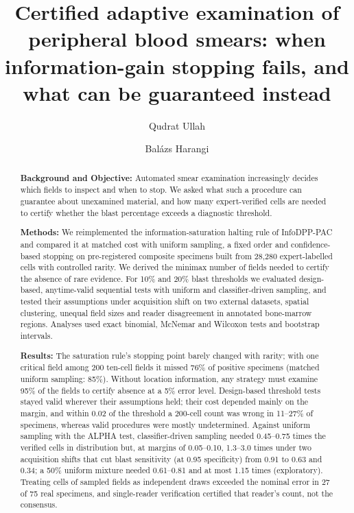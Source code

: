 \documentclass[preprint,12pt]{elsarticle}
\theoremstyle{remark}
\theoremstyle{definition}
\begin{document}
\begin{frontmatter}
\title{Certified adaptive examination of peripheral blood smears: when information-gain stopping fails, and what can be guaranteed instead}
\author[ud]{Qudrat Ullah}
\author[ud]{Bal\'azs Harangi}

\begin{abstract}
\noindent\textbf{Background and Objective:} Automated smear examination increasingly decides which fields to inspect and when to stop. We asked what such a procedure can guarantee about unexamined material, and how many expert-verified cells are needed to certify whether the blast percentage exceeds a diagnostic threshold.

\noindent\textbf{Methods:} We reimplemented the information-saturation halting rule of InfoDPP-PAC and compared it at matched cost with uniform sampling, a fixed order and confidence-based stopping on pre-registered composite specimens built from 28,280 expert-labelled cells with controlled rarity. We derived the minimax number of fields needed to certify the absence of rare evidence. For 10\% and 20\% blast thresholds we evaluated design-based, anytime-valid sequential tests with uniform and classifier-driven sampling, and tested their assumptions under acquisition shift on two external datasets, spatial clustering, unequal field sizes and reader disagreement in annotated bone-marrow regions. Analyses used exact binomial, McNemar and Wilcoxon tests and bootstrap intervals.

\noindent\textbf{Results:} The saturation rule's stopping point barely changed with rarity; with one critical field among 200 ten-cell fields it missed 76\% of positive specimens (matched uniform sampling: 85\%). Without location information, any strategy must examine 95\% of the fields to certify absence at a 5\% error level. Design-based threshold tests stayed valid wherever their assumptions held; their cost depended mainly on the margin, and within 0.02 of the threshold a 200-cell count was wrong in 11--27\% of specimens, whereas valid procedures were mostly undetermined. Against uniform sampling with the ALPHA test, classifier-driven sampling needed 0.45--0.75 times the verified cells in distribution but, at margins of 0.05--0.10, 1.3--3.0 times under two acquisition shifts that cut blast sensitivity (at 0.95 specificity) from 0.91 to 0.63 and 0.34; a 50\% uniform mixture needed 0.61--0.81 and at most 1.15 times (exploratory). Treating cells of sampled fields as independent draws exceeded the nominal error in 27 of 75 real specimens, and single-reader verification certified that reader's count, not the consensus.


\end{abstract}
\end{frontmatter}
\end{document}
